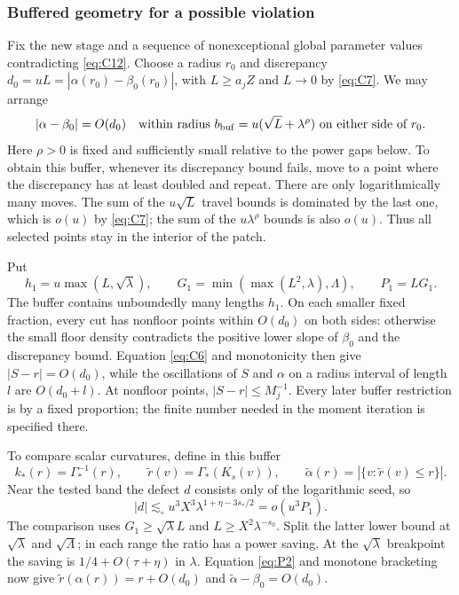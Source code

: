 \subsubsection{Buffered geometry for a possible violation}

Fix the new stage and a sequence of nonexceptional global parameter
values contradicting \eqref{eq:C12}.
Choose a radius \(r_0\) and discrepancy
\(d_0=uL=|\alpha(r_0)-\beta_0(r_0)|\), with
\(L\ge a_jZ\) and \(L\to0\) by \eqref{eq:C7}.
We may arrange
\[
 |\alpha-\beta_0|=O(d_0)
 \quad\text{within radius }b_{\rm buf}
      =u(\sqrt L+\lambda^\rho)\text{ on either side of }r_0.
\]
Here \(\rho>0\) is fixed and sufficiently small relative to the
power gaps below. To obtain this buffer, whenever its discrepancy bound
fails, move to a point where the discrepancy has at least doubled and
repeat. There are only logarithmically many moves. The sum of the
\(u\sqrt L\) travel bounds is dominated by the last one, which is
\(o(u)\) by \eqref{eq:C7}; the sum of the
\(u\lambda^\rho\) bounds is also \(o(u)\).
Thus all selected points stay in the interior of the patch.

Put
\[
 h_1=u\max(L,\sqrt\lambda),\qquad
 G_1=\min(\max(L^2,\lambda),\Lambda),\qquad P_1=LG_1.
\]
The buffer contains unboundedly many lengths \(h_1\). On each smaller
fixed fraction, every cut has nonfloor points within \(O(d_0)\) on
both sides: otherwise the small floor density contradicts the positive
lower slope of \(\beta_0\) and the discrepancy bound.
Equation \eqref{eq:C6} and monotonicity then give
\(|S-r|=O(d_0)\), while the oscillations of \(S\) and \(\alpha\)
on a radius interval of length \(l\) are \(O(d_0+l)\).
At nonfloor points, \(|S-r|\le M_j^{-1}\).
Every later buffer restriction is by a fixed proportion; the finite
number needed in the moment iteration is specified there.

To compare scalar curvatures, define in this buffer
\[
 k_*(r)=\Gamma_*^{-1}(r),\qquad
 \widetilde r(v)=\Gamma_*(K_s(v)),\qquad
 \widetilde\alpha(r)=|\{v:\widetilde r(v)\le r\}|.
\]
Near the tested band the defect \(d\) consists only of the logarithmic
seed, so
\[
 |d|\lesssim_\circ u^3 X^3\lambda^{1+\eta-3s_*/2}=o(u^3P_1).
\]
The comparison uses \(G_1\ge\sqrt\lambda L\) and
\(L\ge X^2\lambda^{-s_0}\). Split the latter lower bound at
\(\sqrt\lambda\) and \(\sqrt\Lambda\); in each range the ratio
has a power saving. At the \(\sqrt\lambda\) breakpoint the saving
is \(1/4+O(\tau+\eta)\) in \(\lambda\).
Equation \eqref{eq:P2} and monotone bracketing now give
\(\widetilde r(\alpha(r))=r+O(d_0)\) and
\(\widetilde\alpha-\beta_0=O(d_0)\).

